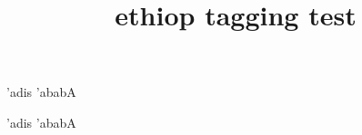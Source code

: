 \documentclass{article}
\title{ethiop tagging test}
\begin{document}
'adis 'ababA

'adis 'ababA
\end{document}
